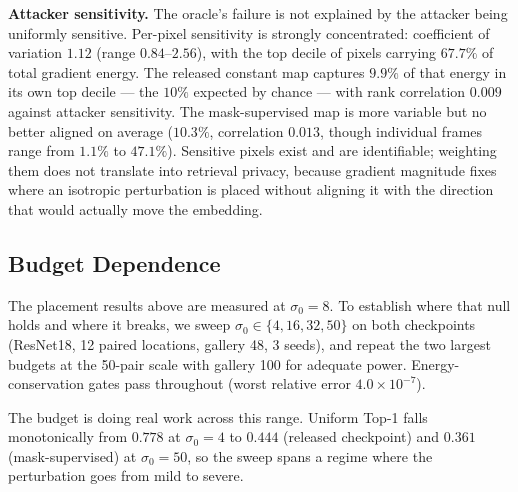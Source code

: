 \documentclass[10pt,journal]{IEEEtran}
\begin{document}
\textbf{Attacker sensitivity.} The oracle's failure is not explained by the
attacker being uniformly sensitive. Per-pixel sensitivity is strongly
concentrated: coefficient of variation $1.12$ (range $0.84$--$2.56$), with the
top decile of pixels carrying $67.7\%$ of total gradient energy. The released
constant map captures $9.9\%$ of that energy in its own top decile --- the
$10\%$ expected by chance --- with rank correlation $0.009$ against attacker
sensitivity. The mask-supervised map is more variable but no better aligned on
average ($10.3\%$, correlation $0.013$, though individual frames range from
$1.1\%$ to $47.1\%$). Sensitive pixels exist and are identifiable; weighting
them does not translate into retrieval privacy, because gradient magnitude
fixes where an isotropic perturbation is placed without aligning it with the
direction that would actually move the embedding.

\subsection{Budget Dependence}
\label{sec:placement_budget}

The placement results above are measured at $\sigma_0=8$. To establish where
that null holds and where it breaks, we sweep
$\sigma_0 \in \{4, 16, 32, 50\}$ on both checkpoints (ResNet18, 12 paired
locations, gallery 48, 3 seeds), and repeat the two largest budgets at the
50-pair scale with gallery 100 for adequate power. Energy-conservation gates
pass throughout (worst relative error $4.0\times10^{-7}$).

The budget is doing real work across this range. Uniform Top-1 falls
monotonically from $0.778$ at $\sigma_0=4$ to $0.444$ (released checkpoint)
and $0.361$ (mask-supervised) at $\sigma_0=50$, so the sweep spans a regime
where the perturbation goes from mild to severe.
\end{document}
